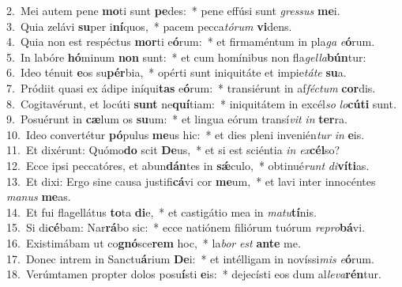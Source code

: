 {2.~}Mei autem pene \textbf{mo}ti sunt \textbf{pe}des:~* pene effúsi sunt \textit{gres}\textit{sus} \textbf{me}i.\\
{3.~}Quia zelávi \textbf{su}per i\textbf{ní}quos,~* pacem pecca\textit{tó}\textit{rum} \textbf{vi}dens.\\
{4.~}Quia non est respéctus \textbf{mor}ti e\textbf{ó}rum:~* et firmaméntum in pla\textit{ga} \textit{e}\textbf{ó}rum.\\
{5.~}In labóre \textbf{hó}minum \textbf{non} sunt:~* et cum homínibus non fla\textit{gel}\textit{la}\textbf{bún}tur:\\
{6.~}Ideo ténuit \textbf{e}os su\textbf{pér}bia,~* opérti sunt iniquitáte et impie\textit{tá}\textit{te} \textbf{su}a.\\
{7.~}Pródiit quasi ex ádipe iníqui\textbf{tas} e\textbf{ó}rum:~* transiérunt in af\textit{fé}\textit{ctum} \textbf{cor}dis.\\
{8.~}Cogitavérunt, et locúti \textbf{sunt} ne\textbf{quí}tiam:~* iniquitátem in excél\textit{so} \textit{lo}\textbf{cú}\textbf{ti} sunt.\\
{9.~}Posuérunt in \textbf{cæ}lum os \textbf{su}um:~* et lingua eórum transí\textit{vit} \textit{in} \textbf{ter}ra.\\
{10.~}Ideo convertétur \textbf{pó}pulus \textbf{me}us hic:~* et dies pleni invenién\textit{tur} \textit{in} \textbf{e}is.\\
{11.~}Et dixérunt: Quómo\textbf{do} scit \textbf{De}us,~* et si est sciéntia \textit{in} \textit{ex}\textbf{cél}so?\\
{12.~}Ecce ipsi peccatóres, et abun\textbf{dán}tes in \textbf{sǽ}culo,~* obtinué\textit{runt} \textit{di}\textbf{ví}\textbf{ti}as.\\
{13.~}Et dixi: Ergo sine causa justifi\textbf{cá}vi cor \textbf{me}um,~* et lavi inter innocéntes \textit{ma}\textit{nus} \textbf{me}as.\\
{14.~}Et fui flagellátus \textbf{to}ta \textbf{di}e,~* et castigátio mea in \textit{ma}\textit{tu}\textbf{tí}nis.\\
{15.~}Si di\textbf{cé}bam: Nar\textbf{rá}bo sic:~* ecce natiónem filiórum tuórum \textit{re}\textit{pro}\textbf{bá}vi.\\
{16.~}Existimábam ut co\textbf{gnó}sce\textbf{rem} hoc,~* la\textit{bor} \textit{est} \textbf{an}\textbf{te} me.\\
{17.~}Donec intrem in Sanctu\textbf{á}rium \textbf{De}i:~* et intélligam in novíssi\textit{mis} \textit{e}\textbf{ó}rum.\\
{18.~}Verúmtamen propter dolos posu\textbf{í}sti \textbf{e}is:~* dejecísti eos dum al\textit{le}\textit{va}\textbf{rén}tur.\\

